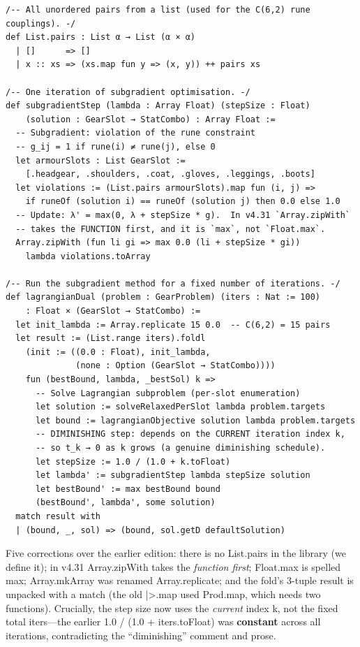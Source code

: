 \documentclass[11pt, a4paper, oneside]{book}
\newcommand{\li}[1]{{\ttfamily\small\color{deepblue}#1}}
\begin{document}
\begin{leanbox}[title={Lean 4 --- Subgradient Method for Lagrangian Dual}]
\begin{verbatim}
/-- All unordered pairs from a list (used for the C(6,2) rune couplings). -/
def List.pairs : List α → List (α × α)
  | []      => []
  | x :: xs => (xs.map fun y => (x, y)) ++ pairs xs

/-- One iteration of subgradient optimisation. -/
def subgradientStep (lambda : Array Float) (stepSize : Float)
    (solution : GearSlot → StatCombo) : Array Float :=
  -- Subgradient: violation of the rune constraint
  -- g_ij = 1 if rune(i) ≠ rune(j), else 0
  let armourSlots : List GearSlot :=
    [.headgear, .shoulders, .coat, .gloves, .leggings, .boots]
  let violations := (List.pairs armourSlots).map fun (i, j) =>
    if runeOf (solution i) == runeOf (solution j) then 0.0 else 1.0
  -- Update: λ' = max(0, λ + stepSize * g).  In v4.31 `Array.zipWith`
  -- takes the FUNCTION first, and it is `max`, not `Float.max`.
  Array.zipWith (fun li gi => max 0.0 (li + stepSize * gi))
    lambda violations.toArray

/-- Run the subgradient method for a fixed number of iterations. -/
def lagrangianDual (problem : GearProblem) (iters : Nat := 100)
    : Float × (GearSlot → StatCombo) :=
  let init_lambda := Array.replicate 15 0.0  -- C(6,2) = 15 pairs
  let result := (List.range iters).foldl
    (init := ((0.0 : Float), init_lambda,
              (none : Option (GearSlot → StatCombo))))
    fun (bestBound, lambda, _bestSol) k =>
      -- Solve Lagrangian subproblem (per-slot enumeration)
      let solution := solveRelaxedPerSlot lambda problem.targets
      let bound := lagrangianObjective solution lambda problem.targets
      -- DIMINISHING step: depends on the CURRENT iteration index k,
      -- so t_k → 0 as k grows (a genuine diminishing schedule).
      let stepSize := 1.0 / (1.0 + k.toFloat)
      let lambda' := subgradientStep lambda stepSize solution
      let bestBound' := max bestBound bound
      (bestBound', lambda', some solution)
  match result with
  | (bound, _, sol) => (bound, sol.getD defaultSolution)
\end{verbatim}
\end{leanbox}

Five corrections over the earlier edition: there is no \li{List.pairs} in the
library (we define it); in v4.31 \li{Array.zipWith} takes the \emph{function
first}; \li{Float.max} is spelled \li{max}; \li{Array.mkArray} was renamed
\li{Array.replicate}; and the fold's 3-tuple result is unpacked with a
\li{match} (the old \li{|>.map} used \li{Prod.map}, which needs two functions).
Crucially, the step size now uses the \emph{current} index \li{k}, not the fixed
total \li{iters}---the earlier \li{1.0 / (1.0 + iters.toFloat)} was
\textbf{constant} across all iterations, contradicting the ``diminishing''
comment and prose.
\end{document}
